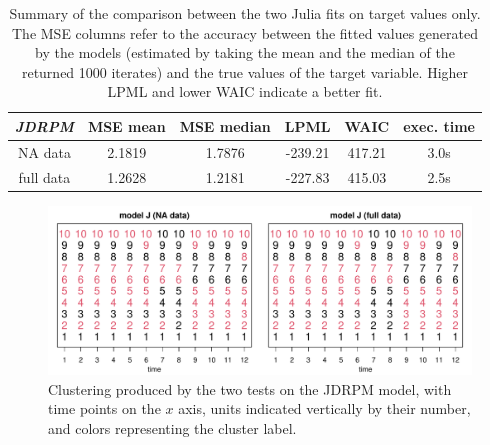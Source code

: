\documentclass[12pt,	%
	a4paper,		%
	twoside,		%
	openright,		%
	titlepage,%
	]{book}
\theoremstyle{definition}
\begin{document}
\begin{table}[!ht]
    \caption[Accuracy metrics of JDRPM fits, target values only, full vs NA dataset]{Summary of the comparison between the two Julia fits on target values only. The MSE columns refer to the accuracy between the fitted values generated by the models (estimated by taking the mean and the median of the returned 1000 iterates) and the true values of the target variable. Higher LPML and lower WAIC indicate a better fit.}
    \centering
    \begin{tabular}{cccccc}
    \toprule
           \textit{JDRPM} & MSE mean &  MSE median & LPML & WAIC & exec. time  \\
           \midrule
        NA data &   2.1819   & 1.7876 & -239.21 & 417.21 & 3.0s\\
        full data& 1.2628 & 1.2181  & -227.83 & 415.03  &  2.5s \\
        \bottomrule
    \end{tabular}
    \label{tab: fits metrics no space julias na full}
\end{table}


\begin{figure}[!ht]
    \centering
    \includegraphics[width=1\linewidth]{Testing/NA data/no space NA/partizioni_nums.pdf}
    \caption[Clusters produced by JDRPM fits, target values only, full vs NA dataset]{Clustering produced by the two tests on the JDRPM model, with time points on the $x$ axis, units indicated vertically by their number, and colors representing the cluster label.}
    \label{fig: partizioni no space NA}
\end{figure}
\end{document}
